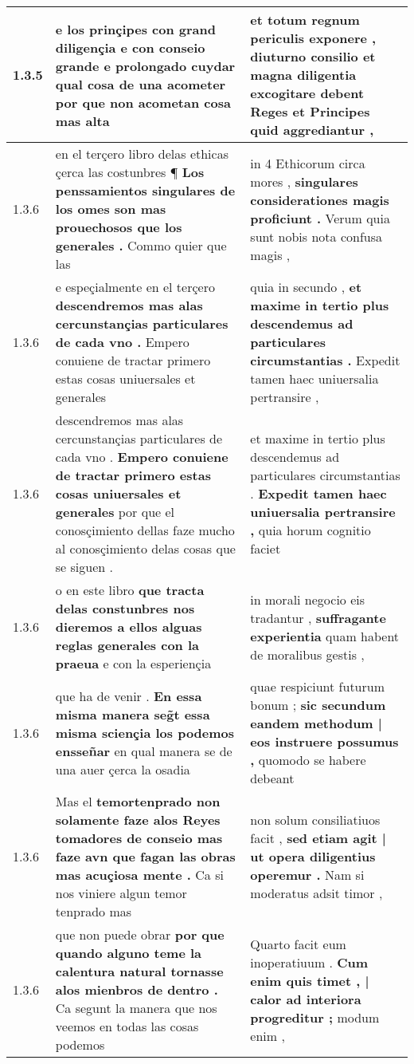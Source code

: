 \begin{tabular}{|p{1cm}|p{6.5cm}|p{6.5cm}|}
1.3.5 & e los prinçipes con grand diligençia \textbf{ e con conseio grande e prolongado cuydar qual cosa de una acometer } por que non acometan cosa mas alta & et totum regnum periculis exponere , \textbf{ diuturno consilio et magna diligentia excogitare debent Reges et Principes } quid aggrediantur , \\\hline
1.3.6 & en el terçero libro delas ethicas çerca las costunbres ¶ \textbf{ Los penssamientos singulares de los omes son mas prouechosos que los generales . } Commo quier que las & in 4 Ethicorum circa mores , \textbf{ singulares considerationes magis proficiunt . } Verum quia sunt nobis nota confusa magis , \\\hline
1.3.6 & e espeçialmente en el terçero \textbf{ descendremos mas alas cercunstançias particulares de cada vno . } Empero conuiene de tractar primero estas cosas uniuersales et generales & quia in secundo , \textbf{ et maxime in tertio plus descendemus ad particulares circumstantias . } Expedit tamen haec uniuersalia pertransire , \\\hline
1.3.6 & descendremos mas alas cercunstançias particulares de cada vno . \textbf{ Empero conuiene de tractar primero estas cosas uniuersales et generales } por que el conosçimiento dellas faze mucho al conosçimiento delas cosas que se siguen . & et maxime in tertio plus descendemus ad particulares circumstantias . \textbf{ Expedit tamen haec uniuersalia pertransire , } quia horum cognitio faciet \\\hline
1.3.6 & o en este libro \textbf{ que tracta delas constunbres nos dieremos a ellos alguas reglas generales con la praeua } e con la esperiençia & in morali negocio eis tradantur , \textbf{ suffragante experientia } quam habent de moralibus gestis , \\\hline
1.3.6 & que ha de venir . \textbf{ En essa misma manera seg̃t essa misma sciençia los podemos ensseñar } en qual manera se de una auer çerca la osadia & quae respiciunt futurum bonum ; \textbf{ sic secundum eandem methodum | eos instruere possumus , } quomodo se habere debeant \\\hline
1.3.6 & Mas el \textbf{ temortenprado non solamente faze alos Reyes tomadores de conseio mas faze avn que fagan las obras mas acuçiosa mente . } Ca si nos viniere algun temor tenprado mas & non solum consiliatiuos facit , \textbf{ sed etiam agit | ut opera diligentius operemur . } Nam si moderatus adsit timor , \\\hline
1.3.6 & que non puede obrar \textbf{ por que quando alguno teme la calentura natural tornasse alos mienbros de dentro . } Ca segunt la manera que nos veemos en todas las cosas podemos & Quarto facit eum inoperatiuum . \textbf{ Cum enim quis timet , | calor ad interiora progreditur ; } modum enim , \\\hline

\end{tabular}
